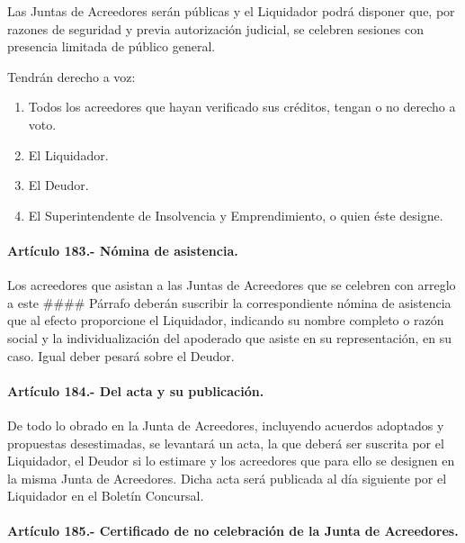 \documentclass[
]{book}
\begin{document}
Las Juntas de Acreedores serán públicas y el Liquidador podrá disponer que, por razones de seguridad y previa autorización judicial, se celebren sesiones con presencia limitada de público general.

Tendrán derecho a voz:

\begin{enumerate}
\def\labelenumi{\arabic{enumi})}
\item
  Todos los acreedores que hayan verificado sus créditos, tengan o no derecho a voto.
\item
  El Liquidador.
\item
  El Deudor.
\item
  El Superintendente de Insolvencia y Emprendimiento, o quien éste designe.
\end{enumerate}

\hypertarget{artuxedculo-183.--nuxf3mina-de-asistencia.}{%
\paragraph*{Artículo 183.- Nómina de asistencia.}\label{artuxedculo-183.--nuxf3mina-de-asistencia.}}

Los acreedores que asistan a las Juntas de Acreedores que se celebren con arreglo a este \#\#\#\# Párrafo deberán suscribir la correspondiente nómina de asistencia que al efecto proporcione el Liquidador, indicando su nombre completo o razón social y la individualización del apoderado que asiste en su representación, en su caso. Igual deber pesará sobre el Deudor.

\hypertarget{artuxedculo-184.--del-acta-y-su-publicaciuxf3n.}{%
\paragraph*{Artículo 184.- Del acta y su publicación.}\label{artuxedculo-184.--del-acta-y-su-publicaciuxf3n.}}

De todo lo obrado en la Junta de Acreedores, incluyendo acuerdos adoptados y propuestas desestimadas, se levantará un acta, la que deberá ser suscrita por el Liquidador, el Deudor si lo estimare y los acreedores que para ello se designen en la misma Junta de Acreedores. Dicha acta será publicada al día siguiente por el Liquidador en el Boletín Concursal.

\hypertarget{artuxedculo-185.--certificado-de-no-celebraciuxf3n-de-la-junta-de-acreedores.}{%
\paragraph*{Artículo 185.- Certificado de no celebración de la Junta de Acreedores.}\label{artuxedculo-185.--certificado-de-no-celebraciuxf3n-de-la-junta-de-acreedores.}}
\end{document}
